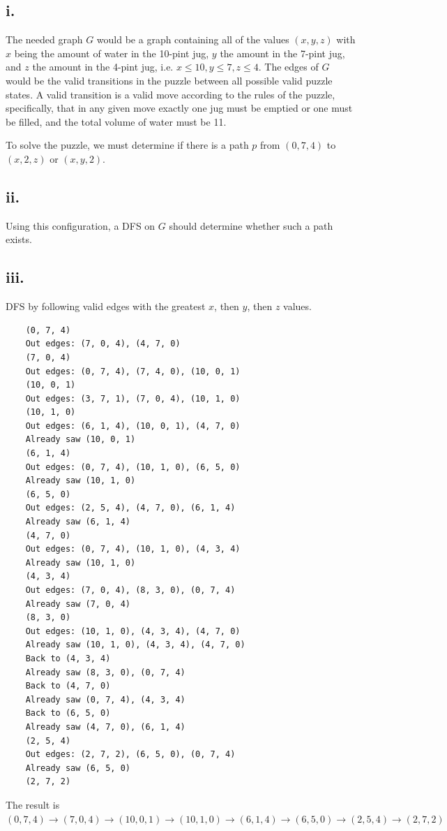 \documentclass[14pt, letterpaper]{article}
\begin{document}
\subsection{i.}
The needed graph $G$ would be a graph containing all of the values $(x, y, z)$ 
with $x$ being the amount of water in the 10-pint jug, $y$ the amount in the 
7-pint jug, and $z$ the amount in the 4-pint jug, i.e.
$x \leq 10, y \leq 7, z \leq 4$. The edges of $G$ would be the valid transitions
in the puzzle between all possible valid puzzle states. A valid transition
is a valid move according to the rules of the puzzle, specifically, that in any
given move exactly one jug must be emptied or one must be filled, and the total
volume of water must be 11.

To solve the puzzle, we must determine if there is a path $p$ from $(0, 7, 4)$
to $(x, 2, z)$ or $(x, y, 2)$.

\subsection{ii.}
Using this configuration, a DFS on $G$ should determine whether such a path 
exists. 

\subsection{iii.}
DFS by following valid edges with the greatest $x$, then $y$, then $z$ values.
\begin{verbatim}
	(0, 7, 4)
	Out edges: (7, 0, 4), (4, 7, 0)
	(7, 0, 4)
	Out edges: (0, 7, 4), (7, 4, 0), (10, 0, 1)
	(10, 0, 1)
	Out edges: (3, 7, 1), (7, 0, 4), (10, 1, 0)
	(10, 1, 0)
	Out edges: (6, 1, 4), (10, 0, 1), (4, 7, 0)
	Already saw (10, 0, 1)
	(6, 1, 4)
	Out edges: (0, 7, 4), (10, 1, 0), (6, 5, 0)
	Already saw (10, 1, 0)
	(6, 5, 0)
	Out edges: (2, 5, 4), (4, 7, 0), (6, 1, 4)
	Already saw (6, 1, 4)
	(4, 7, 0)
	Out edges: (0, 7, 4), (10, 1, 0), (4, 3, 4)
	Already saw (10, 1, 0)
	(4, 3, 4)
	Out edges: (7, 0, 4), (8, 3, 0), (0, 7, 4)
	Already saw (7, 0, 4)
	(8, 3, 0)
	Out edges: (10, 1, 0), (4, 3, 4), (4, 7, 0)
	Already saw (10, 1, 0), (4, 3, 4), (4, 7, 0)
	Back to (4, 3, 4)
	Already saw (8, 3, 0), (0, 7, 4)
	Back to (4, 7, 0)
	Already saw (0, 7, 4), (4, 3, 4)
	Back to (6, 5, 0)
	Already saw (4, 7, 0), (6, 1, 4)
	(2, 5, 4)
	Out edges: (2, 7, 2), (6, 5, 0), (0, 7, 4)
	Already saw (6, 5, 0)
	(2, 7, 2)
\end{verbatim}
The result is $(0, 7, 4) \rightarrow (7, 0, 4) \rightarrow (10, 0, 1) 
\rightarrow (10, 1, 0) \rightarrow (6, 1, 4) \rightarrow (6, 5, 0)
\rightarrow (2, 5, 4) \rightarrow (2, 7, 2)$
\end{document}
